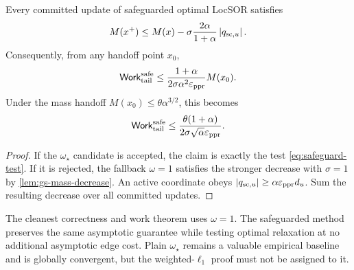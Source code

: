 \begin{theorem}
\label{thm:safeguarded-sor}
Every committed update of safeguarded optimal LocSOR satisfies
\begin{equation}
    M(x^+)\leq M(x)
      -\sigma\frac{2\alpha}{1+\alpha}\left\lvert q_{\mathrm{sc},u}\right\rvert.
    \label{eq:safeguard-decrease}
\end{equation}
Consequently, from any handoff point \(x_0\),
\begin{equation}
    \mathsf{Work}_{\rm tail}^{\rm safe}
    \leq
    \frac{1+\alpha}{2\sigma\alpha^2\varepsilon_{\mathrm{ppr}}}M(x_0).
    \label{eq:safeguard-tail-work}
\end{equation}
Under the mass handoff
\(M(x_0)\leq\theta\alpha^{3/2}\), this becomes
\begin{equation}
    \mathsf{Work}_{\rm tail}^{\rm safe}
    \leq
    \frac{\theta(1+\alpha)}{2\sigma\sqrt\alpha\varepsilon_{\mathrm{ppr}}}.
    \label{eq:safeguard-accelerated}
\end{equation}
\end{theorem}

\begin{proof}
If the \(\omega_\star\) candidate is accepted, the claim is exactly the test
\cref{eq:safeguard-test}.  If it is rejected, the fallback \(\omega=1\)
satisfies the stronger decrease with \(\sigma=1\) by
\cref{lem:gs-mass-decrease}.  An active coordinate obeys
\(\left\lvert q_{\mathrm{sc},u}\right\rvert\geq\alpha\varepsilon_{\mathrm{ppr}} d_u\).  Sum the resulting
decrease over all committed updates.
\end{proof}

\begin{remark}
The cleanest correctness and work theorem uses \(\omega=1\).  The safeguarded
method preserves the same asymptotic guarantee while testing optimal
relaxation at no additional asymptotic edge cost.  Plain \(\omega_\star\)
remains a valuable empirical baseline and is globally convergent, but the
weighted-\(\ell_1\) proof must not be assigned to it.
\end{remark}
